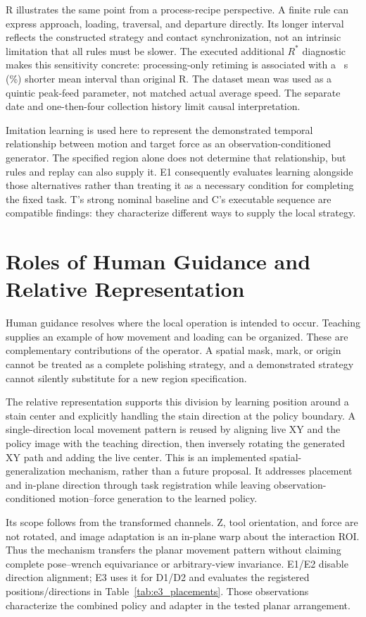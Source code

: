 R illustrates the same point from a process-recipe perspective. A finite rule can express approach, loading, traversal, and departure directly. Its longer interval reflects the constructed strategy and contact synchronization, not an intrinsic limitation that all rules must be slower. The executed additional \(R^{*}\) diagnostic makes this sensitivity concrete: processing-only retiming is associated with a \RstarTimeGain~s (\RstarTimePercent\%) shorter mean interval than original R. The dataset mean was used as a quintic peak-feed parameter, not matched actual average speed. The separate date and one-then-four collection history limit causal interpretation.

Imitation learning is used here to represent the demonstrated temporal relationship between motion and target force as an observation-conditioned generator. The specified region alone does not determine that relationship, but rules and replay can also supply it. E1 consequently evaluates learning alongside those alternatives rather than treating it as a necessary condition for completing the fixed task. T's strong nominal baseline and C's executable sequence are compatible findings: they characterize different ways to supply the local strategy.

\section{Roles of Human Guidance and Relative Representation}
Human guidance resolves where the local operation is intended to occur. Teaching supplies an example of how movement and loading can be organized. These are complementary contributions of the operator. A spatial mask, mark, or origin cannot be treated as a complete polishing strategy, and a demonstrated strategy cannot silently substitute for a new region specification.

The relative representation supports this division by learning position around a stain center and explicitly handling the stain direction at the policy boundary. A single-direction local movement pattern is reused by aligning live XY and the policy image with the teaching direction, then inversely rotating the generated XY path and adding the live center. This is an implemented spatial-generalization mechanism, rather than a future proposal. It addresses placement and in-plane direction through task registration while leaving observation-conditioned motion--force generation to the learned policy.

Its scope follows from the transformed channels. Z, tool orientation, and force are not rotated, and image adaptation is an in-plane warp about the interaction ROI. Thus the mechanism transfers the planar movement pattern without claiming complete pose--wrench equivariance or arbitrary-view invariance. E1/E2 disable direction alignment; E3 uses it for D1/D2 and evaluates the registered positions/directions in Table~\ref{tab:e3_placements}. Those observations characterize the combined policy and adapter in the tested planar arrangement.

